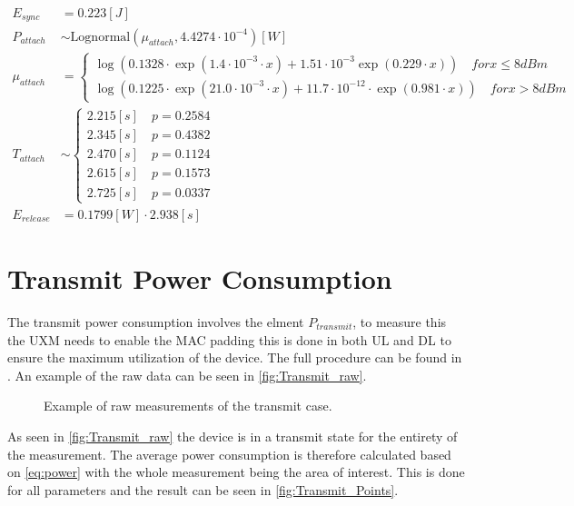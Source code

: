 \begin{align}
E_{sync} &= 0.223 [J] \\
P_{attach} &\sim\text{Lognormal}(\mu_{attach},4.4274\cdot 10^{-4}) [W] \\
\mu_{attach} &= \begin{cases} \log\left(0.1328\cdot\exp(1.4\cdot 10^{-3}\cdot x) + 1.51\cdot 10^{-3}\exp(0.229\cdot x)\right) \quad for x \leq 8 dBm \\
\log\left(0.1225\cdot\exp(21.0\cdot 10^{-3}\cdot x) + 11.7\cdot 10^{-12}\cdot \exp(0.981\cdot x)\right) \quad for x > 8 dBm \end{cases} \\
T_{attach} &\sim\begin{cases} 2.215 [s] \quad p = 0.2584\\
2.345 [s] \quad p = 0.4382\\
2.470 [s] \quad p = 0.1124\\
2.615 [s] \quad p = 0.1573\\
2.725 [s] \quad p = 0.0337
\end{cases}\\
E_{release} &=0.1799 [W] \cdot 2.938 [s] 
\end{align}




\section{Transmit Power Consumption}

The transmit power consumption involves the elment $P_{transmit}$, to measure this the UXM needs to enable the MAC padding this is done in both UL and DL to ensure the maximum utilization of the device. The full procedure can be found in . An example of the raw data can be seen in \autoref{fig:Transmit_raw}.

\begin{figure}[H]
\centering
{}
\resizebox{0.6\textwidth}{!}{
}
\caption{Example of raw measurements of the transmit case.}
\label{fig:Transmit_raw}
\end{figure}

As seen in \autoref{fig:Transmit_raw} the device is in a transmit state for the entirety of the measurement. The average power consumption is therefore calculated based on \autoref{eq:power} with the whole measurement being the area of interest. This is done for all parameters and the result can be seen in \autoref{fig:Transmit_Points}.

